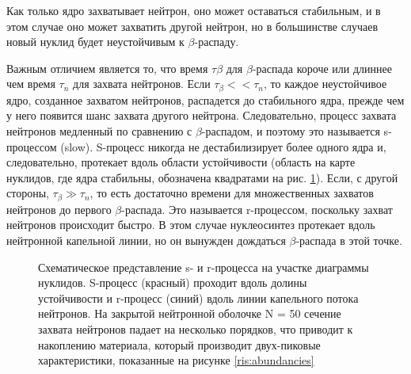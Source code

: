\documentclass[%
master,    %
natbib,      %
subf,        %
href,        %
colorlinks,  %
]{disser}
\begin{document}
Как только ядро захватывает нейтрон, оно может оставаться стабильным, и в этом случае оно может захватить другой нейтрон, но в большинстве случаев новый нуклид будет неустойчивым к $\beta$-распаду.

Важным отличием является то, что время $\tau\beta$ для $\beta$-распада короче или длиннее чем время $\tau_n$ для захвата нейтронов. Если $\tau_\beta << \tau_n$, то каждое неустойчивое ядро, созданное захватом нейтронов, распадется до стабильного ядра, прежде чем у него появится шанс захвата другого нейтрона. Следовательно, процесс захвата нейтронов медленный по сравнению с $\beta$-распадом, и поэтому это называется s-процессом (slow). S-процесс никогда не дестабилизирует более одного ядра и, следовательно, протекает вдоль области устойчивости (область на карте нуклидов, где ядра стабильны, обозначена квадратами на рис. \ref{ris:6}). Если, с другой стороны, $\tau_\beta \gg \tau_n$, то есть достаточно времени для множественных захватов нейтронов до первого $\beta$-распада. Это называется r-процессом, поскольку захват нейтронов происходит быстро. В этом случае нуклеосинтез протекает вдоль нейтронной капельной линии, но он вынужден дождаться $\beta$-распада в этой точке.

\begin{figure}[h]
	\caption{Схематическое представление s- и r-процесса на участке диаграммы нуклидов. S-процесс (красный) проходит вдоль долины устойчивости и r-процесс (синий) вдоль линии капельного потока нейтронов. На закрытой нейтронной оболочке N = 50 сечение захвата нейтронов падает на несколько порядков, что приводит к накоплению материала, который производит двух-пиковые характеристики, показанные на рисунке \ref{ris:abundancies}}
	\label{ris:6}
\end{figure}
\end{document}
